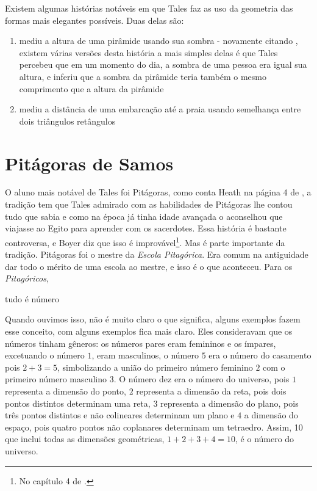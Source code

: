 \documentclass{article}
\begin{document}
Existem algumas histórias notáveis em que Tales faz as uso da geometria
das formas mais elegantes possíveis. Duas delas são:
\begin{enumerate}
	\item mediu a altura de uma pirâmide usando sua sombra - novamente 
		citando \cite{Heath}, existem várias versões desta história
		a mais simples delas é que Tales percebeu que em um momento
		do dia, a sombra de uma pessoa era igual sua altura, e inferiu
		que a sombra da pirâmide teria também o mesmo comprimento que
		a altura da pirâmide
	\item mediu a distância de uma embarcação até a praia usando semelhança
		entre dois triângulos retângulos
\end{enumerate}


\section{Pitágoras de Samos}

O aluno mais notável de Tales foi Pitágoras, como conta Heath na página 4 de \cite{Heath}, a tradição tem que Tales admirado com as habilidades de Pitágoras lhe contou tudo
que sabia e como na época já tinha idade avançada o aconselhou que viajasse ao
Egito para aprender com os sacerdotes. Essa história é bastante controversa, e
Boyer diz que isso é improvável\footnote{No capítulo 4 de \cite{Boyer}.}. Mas 
é parte importante da tradição.
Pitágoras foi o mestre da \emph{Escola Pitagórica}. Era comum na antiguidade
dar todo o mérito de uma escola ao mestre, e isso é o que aconteceu. Para os
\emph{Pitagóricos},

\begin{center}
\begin{framed}
	tudo é número
\end{framed}
\end{center}

Quando ouvimos isso, não é muito claro o que significa, alguns exemplos
fazem esse conceito, com alguns exemplos fica mais claro. Eles consideravam que os números 
tinham gêneros: os números pares eram femininos e os ímpares, excetuando o número
$1$, eram masculinos, 
o número $5$ era o número do casamento pois $2 + 3 = 5$, 
simbolizando a união do primeiro número feminino $2$ com o 
primeiro número masculino $3$. 
O número dez era o número do universo, pois 
$1$ representa a dimensão do ponto, 
$2$ representa a dimensão da reta, pois dois pontos distintos determinam uma reta, 
$3$ representa a dimensão do plano, pois três pontos distintos e não colineares determinam um plano e 
$4$ a dimensão do espaço, pois quatro pontos não coplanares determinam um tetraedro.
Assim, 10 que inclui todas as dimensões geométricas, $1 + 2 + 3 + 4 = 10$, 
é o número do universo.
\end{document}
